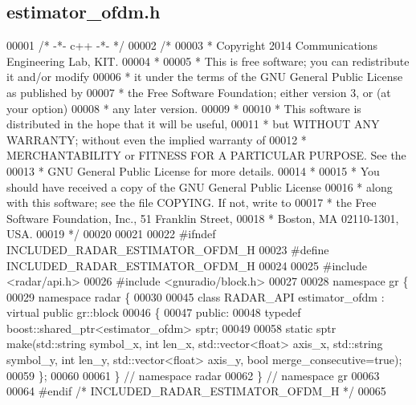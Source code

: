 \subsection{estimator\+\_\+ofdm.\+h}
\label{estimator__ofdm_8h_source}

\begin{DoxyCode}
00001 \textcolor{comment}{/* -*- c++ -*- */}
00002 \textcolor{comment}{/* }
00003 \textcolor{comment}{ * Copyright 2014 Communications Engineering Lab, KIT.}
00004 \textcolor{comment}{ * }
00005 \textcolor{comment}{ * This is free software; you can redistribute it and/or modify}
00006 \textcolor{comment}{ * it under the terms of the GNU General Public License as published by}
00007 \textcolor{comment}{ * the Free Software Foundation; either version 3, or (at your option)}
00008 \textcolor{comment}{ * any later version.}
00009 \textcolor{comment}{ * }
00010 \textcolor{comment}{ * This software is distributed in the hope that it will be useful,}
00011 \textcolor{comment}{ * but WITHOUT ANY WARRANTY; without even the implied warranty of}
00012 \textcolor{comment}{ * MERCHANTABILITY or FITNESS FOR A PARTICULAR PURPOSE.  See the}
00013 \textcolor{comment}{ * GNU General Public License for more details.}
00014 \textcolor{comment}{ * }
00015 \textcolor{comment}{ * You should have received a copy of the GNU General Public License}
00016 \textcolor{comment}{ * along with this software; see the file COPYING.  If not, write to}
00017 \textcolor{comment}{ * the Free Software Foundation, Inc., 51 Franklin Street,}
00018 \textcolor{comment}{ * Boston, MA 02110-1301, USA.}
00019 \textcolor{comment}{ */}
00020 
00021 
00022 \textcolor{preprocessor}{#ifndef INCLUDED\_RADAR\_ESTIMATOR\_OFDM\_H}
00023 \textcolor{preprocessor}{#define INCLUDED\_RADAR\_ESTIMATOR\_OFDM\_H}
00024 
00025 \textcolor{preprocessor}{#include <radar/api.h>}
00026 \textcolor{preprocessor}{#include <gnuradio/block.h>}
00027 
00028 \textcolor{keyword}{namespace }gr \{
00029   \textcolor{keyword}{namespace }radar \{
00030 
00045     \textcolor{keyword}{class }RADAR_API estimator_ofdm : \textcolor{keyword}{virtual} \textcolor{keyword}{public} gr::block
00046     \{
00047      \textcolor{keyword}{public}:
00048       \textcolor{keyword}{typedef} boost::shared\_ptr<estimator\_ofdm> sptr;
00049 
00058       \textcolor{keyword}{static} sptr make(std::string symbol\_x, \textcolor{keywordtype}{int} len\_x, std::vector<float> axis\_x, 
      std::string symbol\_y, \textcolor{keywordtype}{int} len\_y, std::vector<float> axis\_y, \textcolor{keywordtype}{bool} merge\_consecutive=\textcolor{keyword}{true});
00059     \};
00060 
00061   \} \textcolor{comment}{// namespace radar}
00062 \} \textcolor{comment}{// namespace gr}
00063 
00064 \textcolor{preprocessor}{#endif }\textcolor{comment}{/* INCLUDED\_RADAR\_ESTIMATOR\_OFDM\_H */}\textcolor{preprocessor}{}
00065 
\end{DoxyCode}
